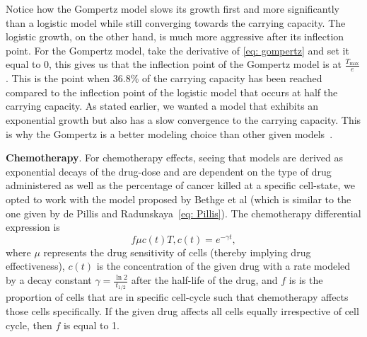 \documentclass[11pt]{amsart}
\begin{document}
Notice how the Gompertz model slows its growth first and more significantly than a logistic model while still converging towards the carrying capacity.
The logistic growth, on the other hand, is much more aggressive after its inflection point.
For the Gompertz model, take the derivative of \eqref{eq: gompertz} and set it equal to 0, this gives us that  the inflection point of the Gompertz model is at $\frac{T_{\max}}{e}$.
This is the point when 36.8\% of the carrying capacity has been reached compared to the inflection point of the logistic model that occurs at half the carrying capacity.
As stated earlier, we wanted a model that exhibits an exponential growth but also has a slow convergence to the carrying capacity.
This is why the Gompertz is a better modeling choice than other given models\ \cite{LairdGompertz}. 

\textbf{Chemotherapy}. For chemotherapy effects, seeing that models are derived as exponential decays of the drug-dose and are dependent on the type of drug administered as well as the percentage of cancer killed at a specific cell-state, we opted to work with the model proposed by Bethge et al (which is similar to the one given by de Pillis and Radunskaya\ \eqref{eq: Pillis}). The chemotherapy differential expression is
\begin{equation}
	f \mu c(t) T, c(t) = e^{-\gamma t} \label{eq: chemo},
\end{equation}
where $\mu$ represents the drug sensitivity of cells (thereby implying drug effectiveness), $c(t)$ is the concentration of the given drug with a rate modeled by a decay constant $\gamma=\frac{\ln{2}}{t_{1/2}}$ after the half-life of the drug, and $f$ is is the proportion of cells that are in specific cell-cycle such that chemotherapy affects those cells specifically.
If the given drug affects all cells equally irrespective of cell cycle, then $f$ is equal to 1.
\end{document}
